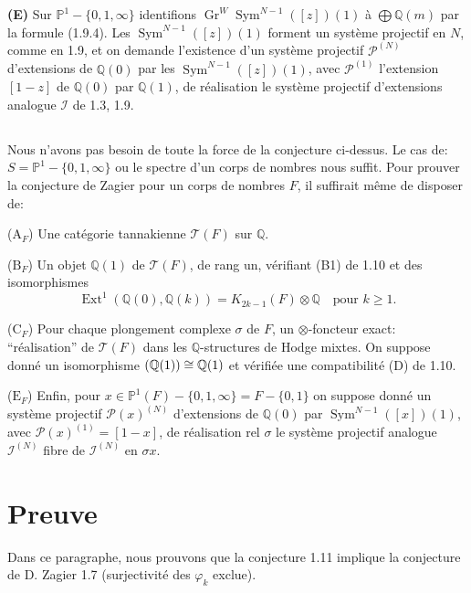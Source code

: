 \documentclass[12pt,a4paper]{article}
\theoremstyle{plain}
\theoremstyle{definition}
\theoremstyle{remark}
\DeclareMathOperator{\Ext}{Ext}
\DeclareMathOperator{\Sym}{Sym}
\newcommand{\Q}{\mathbb{Q}}
\newcommand{\IP}{\mathbb{P}}
\begin{document}
\textbf{(E)} Sur $\IP^1-\{0,1,\infty\}$ identifions $\operatorname{Gr}^W\Sym^{N-1}([z])(1)$ {\`a} $\bigoplus\Q(m)$ par la formule (1.9.4). Les $\Sym^{N-1}([z])(1)$ forment un syst{\`e}me projectif en $N$, comme en 1.9, et on demande l'existence d'un syst{\`e}me projectif $\mathcal{P}^{(N)}$ d'extensions de $\Q(0)$ par les $\Sym^{N-1}([z])(1)$, avec $\mathcal{P}^{(1)}$ l'extension $[1-z]$ de $\Q(0)$ par $\Q(1)$, de r{\'e}alisation le syst{\`e}me projectif d'extensions analogue $\mathcal{I}$ de 1.3, 1.9.

\subsection{}

Nous n'avons pas besoin de toute la force de la conjecture ci-dessus. Le cas de: $S=\IP^1-\{0,1,\infty\}$ ou le spectre d'un corps de nombres nous suffit. Pour prouver la conjecture de Zagier pour un corps de nombres $F$, il suffirait m{\^e}me de disposer de:

($\text{A}_F$) Une cat{\'e}gorie tannakienne $\mathcal{T}(F)$ sur $\Q$.

($\text{B}_F$) Un objet $\Q(1)$ de $\mathcal{T}(F)$, de rang un, v{\'e}rifiant (B1) de 1.10 et des isomorphismes
\begin{equation*}
\Ext^1(\Q(0),\Q(k)) = K_{2k-1}(F)\otimes\Q \quad \text{pour }k\geq 1.
\end{equation*}

($\text{C}_F$) Pour chaque plongement complexe $\sigma$ de $F$, un $\otimes$-foncteur exact: ``r{\'e}alisation'' de $\mathcal{T}(F)$ dans les $\Q$-structures de Hodge mixtes. On suppose donn{\'e} un isomorphisme $\real(\Q(1))\cong\Q(1)$ et v{\'e}rifi{\'e}e une compatibilit{\'e} (D) de 1.10.

($\text{E}_F$) Enfin, pour $x\in\IP^1(F)-\{0,1,\infty\}=F-\{0,1\}$ on suppose donn{\'e} un syst{\`e}me projectif $\mathcal{P}(x)^{(N)}$ d'extensions de $\Q(0)$ par $\Sym^{N-1}([x])(1)$, avec $\mathcal{P}(x)^{(1)}=[1-x]$, de r{\'e}alisation rel $\sigma$ le syst{\`e}me projectif analogue $\mathcal{I}^{(N)}$ fibre de $\mathcal{I}^{(N)}$ en $\sigma x$.


\section{Preuve}

Dans ce paragraphe, nous prouvons que la conjecture 1.11 implique la conjecture de D. Zagier 1.7 (surjectivit{\'e} des $\varphi_k$ exclue).
\end{document}
